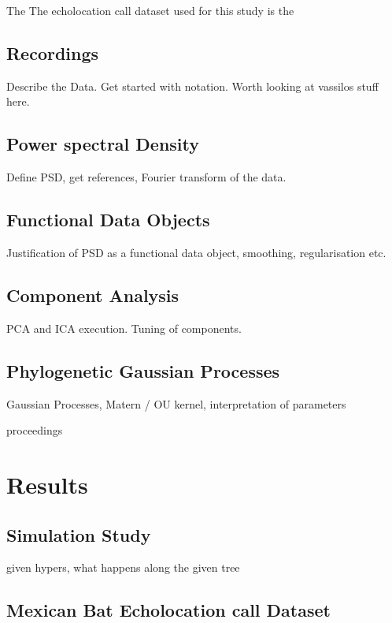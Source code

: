 \documentclass[wsdraft]{ws-rv9x6} %
\begin{document}
The 
The echolocation call dataset used for this study is the 

\subsection{Recordings}

Describe the Data. Get started with notation. Worth looking at vassilos stuff here.

\subsection{Power spectral Density}

Define PSD, get references, Fourier transform of the data.

\subsection{Functional Data Objects}

Justification of PSD as a functional data object, smoothing, regularisation etc.

\subsection{Component Analysis}

PCA and ICA execution. Tuning of components.

\subsection{Phylogenetic Gaussian Processes}

Gaussian Processes, Matern / OU kernel, interpretation of parameters

proceedings 

\section{Results}

\subsection{Simulation Study}

given hypers, what happens along the given tree

\subsection{Mexican Bat Echolocation call Dataset}
\end{document}
